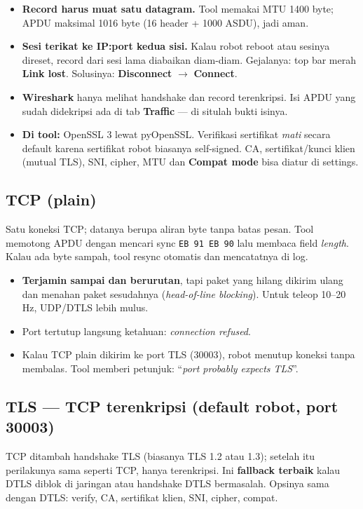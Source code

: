 \documentclass[11pt,a4paper]{article}
\newcommand{\code}[1]{\texttt{#1}}
\newcommand{\ra}{\ensuremath{\rightarrow}}
\newcommand{\ui}[1]{\textbf{#1}}
\begin{document}
\begin{itemize}
\item \textbf{Record harus muat satu datagram.} Tool memakai MTU 1400 byte; APDU maksimal 1016 byte
      (16 header + 1000 ASDU), jadi aman.
\item \textbf{Sesi terikat ke IP:port kedua sisi.} Kalau robot reboot atau sesinya direset, record dari sesi lama
      diabaikan diam-diam. Gejalanya: top bar merah \ui{Link lost}. Solusinya: \ui{Disconnect} \ra{} \ui{Connect}.
\item \textbf{Wireshark} hanya melihat handshake dan record terenkripsi. Isi APDU yang sudah didekripsi ada di tab
      \ui{Traffic} --- di situlah bukti isinya.
\item \textbf{Di tool:} OpenSSL 3 lewat pyOpenSSL. Verifikasi sertifikat \emph{mati} secara default karena sertifikat
      robot biasanya self-signed. CA, sertifikat/kunci klien (mutual TLS), SNI, cipher, MTU dan \ui{Compat mode}
      bisa diatur di settings.
\end{itemize}

\subsection{TCP (plain)}
Satu koneksi TCP; datanya berupa aliran byte tanpa batas pesan. Tool memotong APDU dengan mencari sync
\code{EB 91 EB 90} lalu membaca field \emph{length}. Kalau ada byte sampah, tool resync otomatis dan
mencatatnya di log.
\begin{itemize}
\item \textbf{Terjamin sampai dan berurutan}, tapi paket yang hilang dikirim ulang dan menahan paket
      sesudahnya (\emph{head-of-line blocking}). Untuk teleop 10--20 Hz, UDP/DTLS lebih mulus.
\item Port tertutup langsung ketahuan: \emph{connection refused}.
\item Kalau TCP plain dikirim ke port TLS (30003), robot menutup koneksi tanpa membalas. Tool memberi petunjuk:
      ``\emph{port probably expects TLS}''.
\end{itemize}

\subsection{TLS --- TCP terenkripsi (default robot, port 30003)}
TCP ditambah handshake TLS (biasanya TLS 1.2 atau 1.3); setelah itu perilakunya sama seperti TCP, hanya
terenkripsi. Ini \textbf{fallback terbaik} kalau DTLS diblok di jaringan atau handshake DTLS bermasalah.
Opsinya sama dengan DTLS: verify, CA, sertifikat klien, SNI, cipher, compat.
\end{document}
